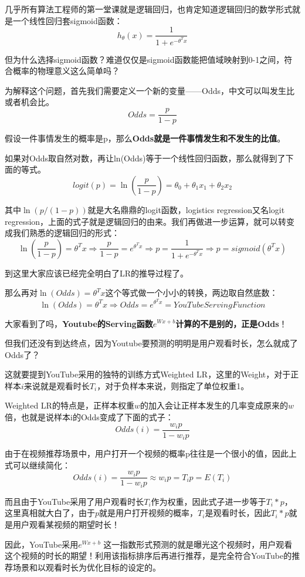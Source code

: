 \documentclass[12pt]{article}
\begin{document}
几乎所有算法工程师的第一堂课就是逻辑回归，也肯定知道逻辑回归的数学形式就是一个线性回归套sigmoid函数：
$$
h_\theta(x) = \frac{1}{1+e^{-\theta^Tx}}
$$

但为什么选择sigmoid函数？难道仅仅是sigmoid函数能把值域映射到0-1之间，符合概率的物理意义这么简单吗？

为解释这个问题，首先我们需要定义一个新的变量——Odds，中文可以叫发生比或者机会比。
$$
Odds = \frac{p}{1-p}
$$

假设一件事情发生的概率是p，那么\textbf{Odds就是一件事情发生和不发生的比值}。

如果对Odds取自然对数，再让ln(Odds)等于一个线性回归函数，那么就得到了下面的等式。
$$
logit(p) = \ln(\frac{p}{1-p}) = \theta_0 + \theta_1x_1 + \theta_2x_2
$$

其中$\ln(p/(1-p))$就是大名鼎鼎的logit函数，logistics regression又名logit regression，上面的式子就是逻辑回归的由来。我们再做进一步运算，就可以转变成我们熟悉的逻辑回归的形式：
$$
 \ln(\frac{p}{1-p}) = \theta^Tx \Rightarrow \frac{p}{1-p} = e^{\theta^Tx} \Rightarrow p = \frac{1}{1+e^{-\theta^Tx}} \Rightarrow p = sigmoid(\theta^Tx)
$$

到这里大家应该已经完全明白了LR的推导过程了。

那么再对$\ln(Odds) = \theta^Tx$这个等式做一个小小的转换，两边取自然底数：
$$
\ln(Odds) = \theta^Tx \Rightarrow Odds = e^{\theta^Tx} = YouTubeServingFunction
$$

大家看到了吗，\textbf{Youtube的Serving函数$e^{Wx+b}$计算的不是别的，正是Odds}！

但我们还没有到达终点，因为Youtube要预测的明明是用户观看时长，怎么就成了Odds了？

这就要提到YouTube采用的独特的训练方式Weighted LR，这里的Weight，对于正样本$i$来说就是观看时长$T_i$，对于负样本来说，则指定了单位权重1。

Weighted LR的特点是，正样本权重$w$的加入会让正样本发生的几率变成原来的$w$倍，也就是说样本i的Odds变成了下面的式子：
$$
Odds(i) = \frac{w_ip}{1-w_ip}
$$

由于在视频推荐场景中，用户打开一个视频的概率p往往是一个很小的值，因此上式可以继续简化：
$$
Odds(i) = \frac{w_ip}{1-w_ip} \approx w_ip = T_ip = E(T_i)
$$

而且由于YouTube采用了用户观看时长$T_i$作为权重，因此式子进一步等于$T_i*p$，这里真相就大白了，由于$p$就是用户打开视频的概率，$T_i$是观看时长，因此$T_i*p$就是用户观看某视频的期望时长！

因此，YouTube采用$e^{Wx+b}$ 这一指数形式预测的就是曝光这个视频时，用户观看这个视频的时长的期望！利用该指标排序后再进行推荐，是完全符合YouTube的推荐场景和以观看时长为优化目标的设定的。
\end{document}
